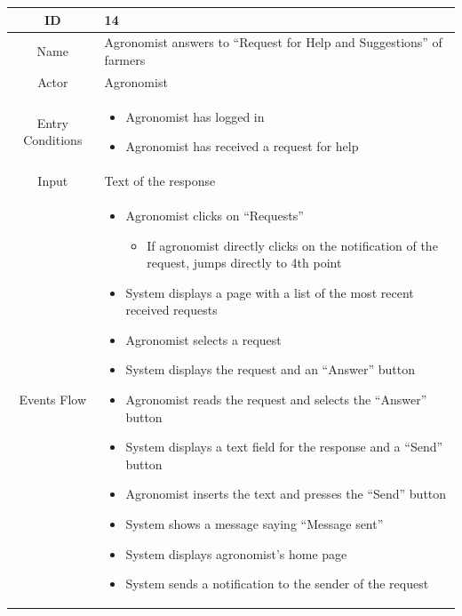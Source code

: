 \documentclass{article}
\begin{document}
\begin{center}
    \begin{longtable}{|c| p{10cm}|}
        \hline
            ID & 14 \\
        \hline
            Name & Agronomist answers to “Request for Help and Suggestions” of farmers\\
        \hline
            Actor & Agronomist \\
        \hline
            Entry Conditions &  \begin{itemize}
                                    \item Agronomist has logged in
                                    \item Agronomist has received a request for help
                                \end{itemize}\\
        \hline
            Input & Text of the response\\
        \hline
            Events Flow &   \begin{itemize}
                                \item Agronomist clicks on “Requests” 
                                        \begin{itemize}
                                            \item If agronomist directly clicks on the notification of the request, jumps directly to 4th point
                                        \end{itemize}
                                \item System displays a page with a list of the most recent received requests
                                \item Agronomist selects a request
                                \item System displays the request and an “Answer” button
                                \item Agronomist reads the request and selects the “Answer” button
                                \item System displays a text field for the response and a “Send” button
                                \item Agronomist inserts the text and presses the “Send” button
                                \item System shows a message saying “Message sent” 
                                \item System displays agronomist’s home page
                                \item System sends a notification to the sender of the request

\end{itemize}
\end{longtable}
\end{center}
\end{document}
